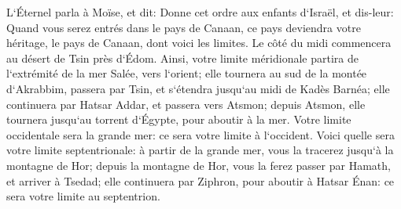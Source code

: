 \verse L`Éternel parla à Moïse, et dit: 
\verse Donne cet ordre aux enfants d`Israël, et dis-leur: Quand vous serez entrés dans le pays de Canaan, ce pays deviendra votre héritage, le pays de Canaan, dont voici les limites. 
\verse Le côté du midi commencera au désert de Tsin près d`Édom. Ainsi, votre limite méridionale partira de l`extrémité de la mer Salée, vers l`orient; 
\verse elle tournera au sud de la montée d`Akrabbim, passera par Tsin, et s`étendra jusqu`au midi de Kadès Barnéa; elle continuera par Hatsar Addar, et passera vers Atsmon; 
\verse depuis Atsmon, elle tournera jusqu`au torrent d`Égypte, pour aboutir à la mer. 
\verse Votre limite occidentale sera la grande mer: ce sera votre limite à l`occident. 
\verse Voici quelle sera votre limite septentrionale: à partir de la grande mer, vous la tracerez jusqu`à la montagne de Hor; 
\verse depuis la montagne de Hor, vous la ferez passer par Hamath, et arriver à Tsedad; 
\verse elle continuera par Ziphron, pour aboutir à Hatsar Énan: ce sera votre limite au septentrion. 
